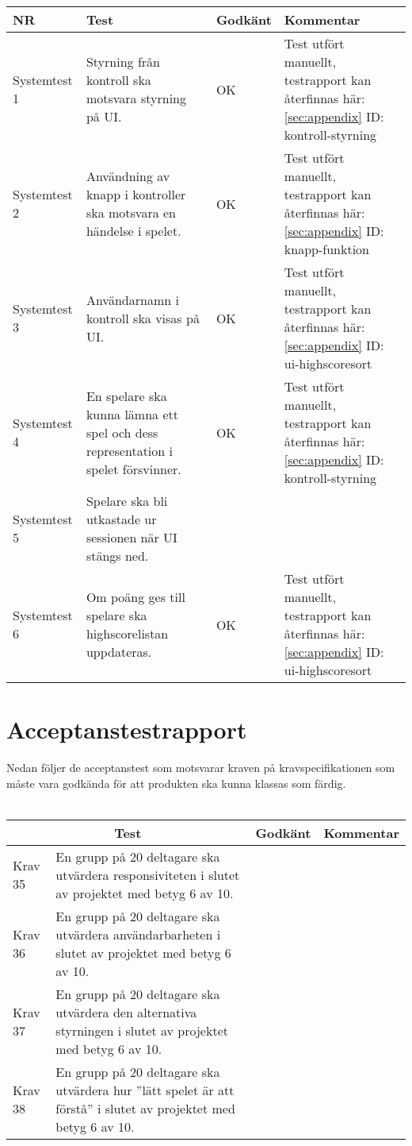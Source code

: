 \documentclass[10pt]{article}
\begin{document}
	\begin{tabular}{| p{2.1cm}| p{5cm}| p{1.2cm}| p{7cm}|}
      		\hline
      		NR&Test&Godkänt&Kommentar\\
      		\hline

		Systemtest 1&Styrning från kontroll ska motsvara styrning på UI.&OK&Test utfört manuellt, testrapport kan återfinnas här: \ref{sec:appendix} ID: kontroll-styrning\\
		\hline
		Systemtest 2&Användning av knapp i kontroller ska motsvara en händelse i spelet.&OK&Test utfört manuellt, testrapport kan återfinnas här: \ref{sec:appendix} ID: knapp-funktion\\
		\hline
		Systemtest 3&Användarnamn i kontroll ska visas på UI.&OK&Test utfört manuellt, testrapport kan återfinnas här: \ref{sec:appendix} ID: ui-highscoresort\\
		\hline
		Systemtest 4&En spelare ska kunna lämna ett spel och dess representation i spelet försvinner.&OK&Test utfört manuellt, testrapport kan återfinnas här: \ref{sec:appendix} ID: kontroll-styrning\\
		\hline
		Systemtest 5&Spelare ska bli utkastade ur sessionen när UI stängs ned.&&\\
		\hline
		Systemtest 6&Om poäng ges till spelare ska highscorelistan uppdateras.&OK&Test utfört manuellt, testrapport kan återfinnas här: \ref{sec:appendix} ID: ui-highscoresort\\
		\hline




  \end{tabular}

\section{Acceptanstestrapport}
Nedan följer de acceptanstest som motsvarar kraven på kravspecifikationen \cite{bib-kravspec} som måste vara godkända för att produkten ska kunna klassas som färdig.
\\ \\
\noindent
	\begin{tabular}{| p{1.5cm} | p{5cm} | p{1.2cm}| p{7cm}|}

  \hline
    \multicolumn{2}{|c|}{Test}&{Godkänt}&{Kommentar}\\
    \hline


		Krav 35& En grupp på 20 deltagare ska utvärdera responsiviteten i slutet av projektet med betyg 6 av 10.&& \\
		\hline
		Krav 36& En grupp på 20 deltagare ska utvärdera användarbarheten i slutet av projektet med betyg 6 av 10.&& \\
		\hline
		Krav 37& En grupp på 20 deltagare ska utvärdera den alternativa styrningen i slutet av projektet med betyg 6 av 10.&& \\
		\hline
		Krav 38& En grupp på 20 deltagare ska utvärdera hur ''lätt spelet är att förstå'' i slutet av projektet med betyg 6 av 10.&& \\
		\hline


  \end{tabular}
\end{document}

